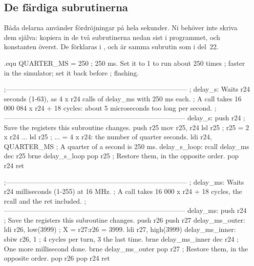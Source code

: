 \subsection{De färdiga subrutinerna}
\label{lab3:sec:subroutines}
Båda delarna använder fördröjningar på hela sekunder. Ni behöver inte skriva dem själva: kopiera in
de två subrutinerna nedan sist i programmet, och konstanten  överst. De förklaras
i , och  är samma subrutin som i del~22.

\begin{asmcode}
.equ QUARTER_MS = 250               ; 250 ms. Set it to 1 to run about 250 times
                                    ; faster in the simulator; set it back before
                                    ; flashing.
\end{asmcode}

\begin{asmcode}
;--------------------------------------------------------------------------------
; delay_s: Waits r24 seconds (1-63), as 4 x r24 calls of delay_ms with 250 ms each.
; A call takes 16 000 084 x r24 + 18 cycles: about 5 microseconds too long per second.
;--------------------------------------------------------------------------------
delay_s:
    push r24                        ; Save the registers this subroutine changes.
    push r25
    mov r25, r24
    lsl r25                         ; r25 = 2 x r24 ...
    lsl r25                         ; ... = 4 x r24: the number of quarter seconds.
    ldi r24, QUARTER_MS             ; A quarter of a second is 250 ms.
delay_s_loop:
    rcall delay_ms
    dec r25
    brne delay_s_loop
    pop r25                         ; Restore them, in the opposite order.
    pop r24
    ret

;--------------------------------------------------------------------------------
; delay_ms: Waits r24 milliseconds (1-255) at 16 MHz.
; A call takes 16 000 x r24 + 18 cycles, the rcall and the ret included.
;--------------------------------------------------------------------------------
delay_ms:
    push r24                        ; Save the registers this subroutine changes.
    push r26
    push r27
delay_ms_outer:
    ldi r26, low(3999)              ; X = r27:r26 = 3999.
    ldi r27, high(3999)
delay_ms_inner:
    sbiw r26, 1                     ; 4 cycles per turn, 3 the last time.
    brne delay_ms_inner
    dec r24                         ; One more millisecond done.
    brne delay_ms_outer
    pop r27                         ; Restore them, in the opposite order.
    pop r26
    pop r24
    ret
\end{asmcode}

